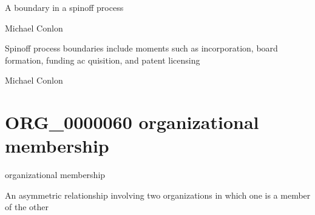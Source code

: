 \documentclass[letterpaper,10pt,english]{sphinxmanual}
\begin{document}
\begin{sphinxShadowBox}

\sphinxAtStartPar
A boundary in a spin\sphinxhyphen{}off process
\end{sphinxShadowBox}

\begin{sphinxShadowBox}

\sphinxAtStartPar
Michael Conlon 
\end{sphinxShadowBox}

\begin{sphinxShadowBox}

\sphinxAtStartPar
Spin\sphinxhyphen{}off process boundaries include moments such as incorporation, board formation, funding ac quisition, and patent licensing
\end{sphinxShadowBox}

\begin{sphinxShadowBox}

\sphinxAtStartPar
Michael Conlon 
\end{sphinxShadowBox}
\begin{quote}
\label{\detokenize{doc-ORG_0000060:org-0000060}}\label{\detokenize{doc-ORG_0000060:organizational-membership}}\label{\detokenize{doc-ORG_0000060:org-0000060}}
\ignorespaces \end{quote}


\section{ORG\_0000060 \sphinxhyphen{} organizational membership}
\label{\detokenize{doc-ORG_0000060:org-0000060-organizational-membership}}\label{\detokenize{doc-ORG_0000060:index-0}}\label{\detokenize{doc-ORG_0000060::doc}}
\begin{sphinxShadowBox}

\sphinxAtStartPar
organizational membership
\end{sphinxShadowBox}

\begin{sphinxShadowBox}

\sphinxAtStartPar
An asymmetric relationship involving two organizations in which one is a member of the other
\end{sphinxShadowBox}
\end{document}

